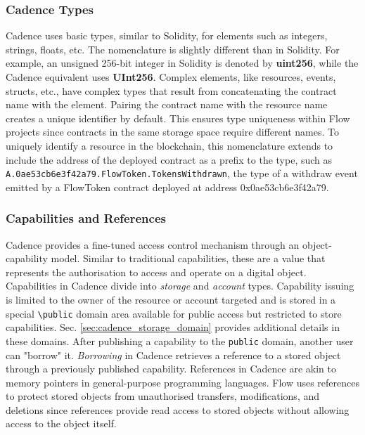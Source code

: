 \documentclass[../NFTComp_IEEE.tex]{subfiles}
\begin{document}
\subsubsection{Cadence Types}
Cadence uses basic types, similar to Solidity, for elements such as integers, strings, floats, etc. The nomenclature is slightly different than in Solidity. For example, an unsigned 256-bit integer in Solidity is denoted by \textbf{uint256}, while the Cadence equivalent uses \textbf{UInt256}. Complex elements, like resources, events, structs, etc., have complex types that result from concatenating the contract name with the element. Pairing the contract name with the resource name creates a unique identifier by default. This ensures type uniqueness within Flow projects since contracts in the same storage space require different names. To uniquely identify a resource in the blockchain, this nomenclature extends to include the address of the deployed contract as a prefix to the type, such as \verb|A.0ae53cb6e3f42a79.FlowToken.TokensWithdrawn|, the type of a withdraw event emitted by a FlowToken contract deployed at address 0x0ae53cb6e3f42a79.

\subsubsection{Capabilities and References}
\label{sec:cadence_capabilities}
Cadence provides a fine-tuned access control mechanism through an object-capability model. Similar to traditional capabilities, these are a value that represents the authorisation to access and operate on a digital object. Capabilities in Cadence divide into \textit{storage} and \textit{account} types. Capability issuing is limited to the owner of the resource or account targeted and is stored in a special \verb|\public| domain area available for public access but restricted to store capabilities. Sec. \ref{sec:cadence_storage_domain} provides additional details in these domains. After publishing a capability to the \verb|public| domain, another user can "borrow" it. \textit{Borrowing} in Cadence retrieves a reference to a stored object through a previously published capability. References in Cadence are akin to memory pointers in general-purpose programming languages. Flow uses references to protect stored objects from unauthorised transfers, modifications, and deletions since references provide read access to stored objects without allowing access to the object itself. 
\end{document}
